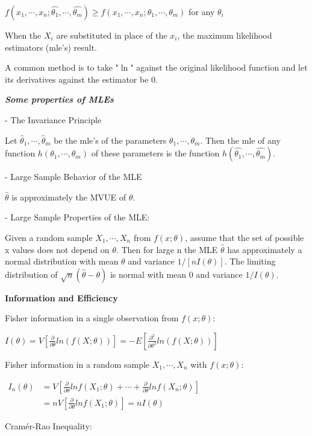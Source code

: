 \documentclass{article}
\newcommand{\bigtitle}[1]{
	\noindent
	\textbf{#1}
}
\newcommand{\smalltitle}[1]{
	\noindent
	\textbf{\textit{#1}}
}
\begin{document}
	\noindent
	$f(x_1, \cdots, x_n; \hat{\theta_1}, \cdots, \hat{\theta_m}) \geq f(x_1, \cdots, x_n; \theta_1, \cdots, \theta_m)$ for any $\theta_i$
	
	When the $X_i$ are substituted in place of the $x_i$, the maximum likelihood estimators (mle's) result.
	
	A common method is to take "$\ln$" against the original likelihood function and let its derivatives against the estimator be 0.
	
	\smalltitle{Some properties of MLEs}
	
	\noindent
	- The Invariance Principle
	
	Let $ \hat{\theta}_1,\cdots,\hat{\theta}_m $ be the mle's of the parameters $ \theta_1, \cdots, \theta_m $. Then the mle
	of any function $ h( \theta_1, \cdots, \theta_m ) $ of these parameters is the function $ h(\hat{\theta_1}, \cdots, \hat{\theta_m}) $.
	
	\noindent
	- Large Sample Behavior of the MLE
	
	$\hat{\theta}$ is approximately the MVUE of $\theta$.
	
	\noindent
	- Large Sample Properties of the MLE:
	
	Given a random sample $X_1,\cdots,X_n$ from $f(x;\theta)$, assume that the set of possible x values does not depend on $\theta$. Then for large n the MLE $\hat{\theta}$ has approximately a normal distribution with mean $\theta$ and variance $1/[nI(\theta)]$. The limiting distribution of $\sqrt{n}(\hat{\theta}-\theta)$ is normal with mean 0 and variance $1/I(\theta)$.
	
	\bigtitle{Information and Efficiency}
	
	Fisher information in a single observation from $f(x;\theta)$:
	
	$I(\theta) = V\left[\frac{\partial}{\partial\theta}ln(f(X;\theta))\right] = -E\left[\frac{\partial^2}{\partial\theta^2}ln(f(X;\theta))\right]$
	
	Fisher information in a random sample $X_1,\cdots, X_n$ with $f(x;\theta)$:
	
	
	$
	\begin{aligned}
	I_n(\theta) & = V\left[\frac{\partial}{\partial\theta}lnf(X_1;\theta)+\cdots+\frac{\partial}{\partial\theta}lnf(X_n;\theta)\right] \\
	& = nV\left[\frac{\partial}{\partial\theta}lnf(X_1;\theta)\right] = nI(\theta)
	\end{aligned}$
	
	Cram\'{e}r-Rao Inequality:
	
\end{document}
